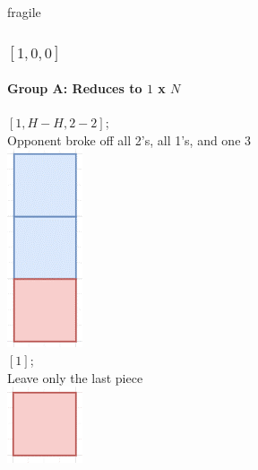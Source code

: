 \documentclass[aspectratio=169,usenames,dvipsnames]{beamer}
\begin{document}
\begin{frame}{fragile}
    \frametitle{$[1, 0, 0]$}
    \framesubtitle{Group A: Reduces to $1$ x $N$}
    
    \begin{multicols}{2}
    $[1, H - H, 2 - 2]$; \\
    Opponent broke off all 2’s, all 1’s, and one 3\\
    \includegraphics[scale=.4]{images/[1, 0, 0].png}\\
    $[1]$; \\
    Leave only the last piece\\
    \includegraphics[scale=.4]{images/[1].png}
    \end{multicols}
\end{frame}
\end{document}
